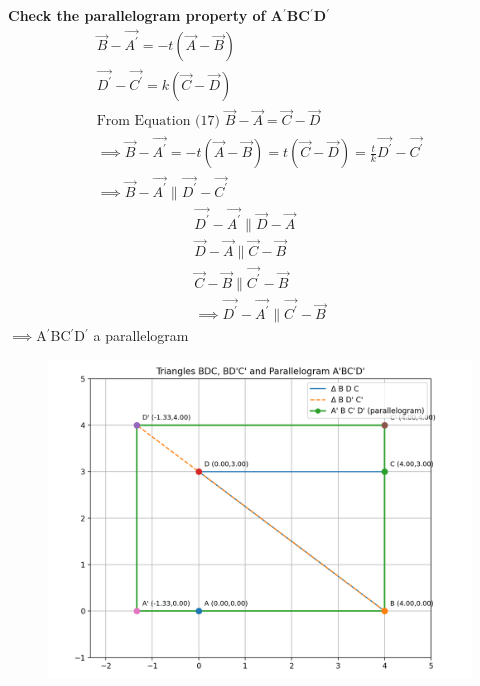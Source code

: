 \documentclass[journal]{IEEEtran}
\begin{document}
\textbf{Check the parallelogram property of A$^{\prime}$BC$^{\prime}$D$^{\prime}$ }\\
\begin{align}
    \vec{B}-\vec{A^{\prime}}=-t(\vec{A}-\vec{B})\\
    \vec{D^{\prime}}-\vec{C^{\prime}}=k(\vec{C}-\vec{D})\\
    \text{From Equation (17) }\Vec{B}-\Vec{A}=\Vec{C}-\Vec{D}\\
\implies \vec{B}-\vec{A^{\prime}}=-t(\vec{A}-\vec{B})=t(\vec{C}-\vec{D})=\frac{t}{k}\vec{D^{\prime}}-\vec{C^{\prime}}\\
\implies \vec{B}-\vec{A^{\prime}} \parallel \vec{D^{\prime}}-\vec{C^{\prime}}
\end{align}
    \begin{align}
    \vec{D^{\prime}}-\vec{A^{\prime}} \parallel \vec{D}-\vec{A}\\
    \vec{D}-\vec{A} \parallel \Vec{C}-\vec{B}\\
     \Vec{C}-\vec{B} \parallel \Vec{C^{\prime}}-\Vec{B}\\
\implies \vec{D^{\prime}}-\vec{A^{\prime}} \parallel \Vec{C^{\prime}}-\Vec{B}
\end{align}
$\implies$A$^{\prime}$BC$^{\prime}$D$^{\prime}$ a parallelogram
\begin{figure}[H]
    \centering
    \includegraphics[width=1.0\columnwidth]{figs/01.png}
    \label{fig-1}
\end{figure}
\end{document}
